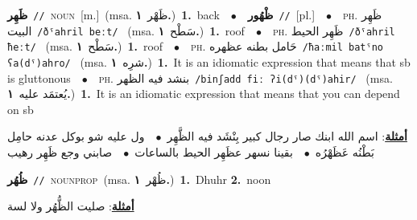 \documentclass[10pt,a4paper,twoside]{article} %
\begin{document}
\begin{multicols}{2}
{{{{{{\setlength\topsep{0pt}\textbf{\foreignlanguage{arabic}{ظَهِر}}\ {\color{gray}\texttt{//}\color{black}}\ \textsc{noun}\ [m.]\ \color{gray}(msa. \foreignlanguage{arabic}{ظَهْر}~\foreignlanguage{arabic}{\textbf{١.}})\color{black}\ \textbf{1.}~back\ \ $\bullet$\ \ \setlength\topsep{0pt}\textbf{\foreignlanguage{arabic}{ظْهُور}}\ {\color{gray}\texttt{//}\color{black}}\ [pl.]\ \ $\bullet$\ \ \textsc{ph.} \color{gray} \foreignlanguage{arabic}{ظَهِر البيت}\color{black}\ {\color{gray}\texttt{/{\sffamily ðˤahril beːt}/}\color{black}}\ \color{gray} (msa. \foreignlanguage{arabic}{سَطْح}~\foreignlanguage{arabic}{\textbf{١.}})\color{black}\ \textbf{1.}~roof\ \ $\bullet$\ \ \textsc{ph.} \color{gray} \foreignlanguage{arabic}{ظَهِر الحيط}\color{black}\ {\color{gray}\texttt{/{\sffamily ðˤahril ħeːt}/}\color{black}}\ \color{gray} (msa. \foreignlanguage{arabic}{سَطْح}~\foreignlanguage{arabic}{\textbf{١.}})\color{black}\ \textbf{1.}~roof\ \ $\bullet$\ \ \textsc{ph.} \color{gray} \foreignlanguage{arabic}{حَامل بطنه عظهره}\color{black}\ {\color{gray}\texttt{/{\sffamily ħaːmil batˤno ʕa(dˤ)ahro}/}\color{black}}\ \color{gray} (msa. \foreignlanguage{arabic}{شرِه}~\foreignlanguage{arabic}{\textbf{١.}})\color{black}\ \textbf{1.}~It is an idiomatic expression that means that sb is gluttonous\ \ $\bullet$\ \ \textsc{ph.} \color{gray} \foreignlanguage{arabic}{بنشد فيه الظهر}\color{black}\ {\color{gray}\texttt{/{\sffamily binʃadd fiː ʔi(dˤ)(dˤ)ahir}/}\color{black}}\ \color{gray} (msa. \foreignlanguage{arabic}{يُعتمَد عليه}~\foreignlanguage{arabic}{\textbf{١.}})\color{black}\ \textbf{1.}~It is an idiomatic expression that means that you can depend on sb\  \begin{flushright}\color{gray}\foreignlanguage{arabic}{\textbf{\underline{\foreignlanguage{arabic}{أمثلة}}}: اسم الله ابنك صار رجال كبير بِنْشَد فيه الظَّهِر\ $\bullet$\ \  ول عليه شو بوكل عدنه حامِل بَطْنُه عَظَهْرُه\ $\bullet$\ \  بقينا نسهر عظَهِر الحيط بالساعات\ $\bullet$\ \  صابني وجع ظَهِر رهيب}\end{flushright}\color{black}} \vspace{2mm}

{\setlength\topsep{0pt}\textbf{\foreignlanguage{arabic}{ظُهُر}}\ {\color{gray}\texttt{//}\color{black}}\ \textsc{noun\textunderscore prop}\ \color{gray}(msa. \foreignlanguage{arabic}{ظُهْر}~\foreignlanguage{arabic}{\textbf{١.}})\color{black}\ \textbf{1.}~Dhuhr  \textbf{2.}~noon\  \begin{flushright}\color{gray}\foreignlanguage{arabic}{\textbf{\underline{\foreignlanguage{arabic}{أمثلة}}}: صليت الظُّهُر ولا لسة}\end{flushright}\color{black}} \vspace{2mm}

}}}}}
\end{multicols}
\end{document}
